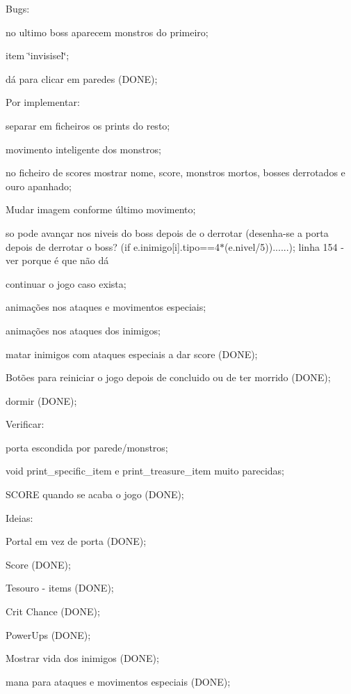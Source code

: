 Bugs\+:
\begin{DoxyItemize}
\item no ultimo boss aparecem monstros do primeiro;
\item item \char`\"{}invisisel\char`\"{};
\item dá para clicar em paredes (D\+O\+NE);
\end{DoxyItemize}

Por implementar\+:
\begin{DoxyItemize}
\item separar em ficheiros os prints do resto;
\item movimento inteligente dos monstros;
\item no ficheiro de scores mostrar nome, score, monstros mortos, bosses derrotados e ouro apanhado;
\item Mudar imagem conforme último movimento;
\item so pode avançar nos niveis do boss depois de o derrotar (desenha-\/se a porta depois de derrotar o boss? (if e.\+inimigo\mbox{[}i\mbox{]}.tipo==4$\ast$(e.\+nivel/5))......); linha 154 -\/ ver porque é que não dá
\item continuar o jogo caso exista;
\item animações nos ataques e movimentos especiais;
\item animações nos ataques dos inimigos;
\item matar inimigos com ataques especiais a dar score (D\+O\+NE);
\item Botões para reiniciar o jogo depois de concluido ou de ter morrido (D\+O\+NE);
\item dormir (D\+O\+NE);
\end{DoxyItemize}

Verificar\+:
\begin{DoxyItemize}
\item porta escondida por parede/monstros;
\item void print\+\_\+specific\+\_\+item e print\+\_\+treasure\+\_\+item muito parecidas;
\item S\+C\+O\+RE quando se acaba o jogo (D\+O\+NE);
\end{DoxyItemize}

Ideias\+:


\begin{DoxyItemize}
\item Portal em vez de porta (D\+O\+NE);
\item Score (D\+O\+NE);
\item Tesouro -\/ items (D\+O\+NE);
\item Crit Chance (D\+O\+NE);
\item Power\+Ups (D\+O\+NE);
\item Mostrar vida dos inimigos (D\+O\+NE);
\item mana para ataques e movimentos especiais (D\+O\+NE); 
\end{DoxyItemize}
